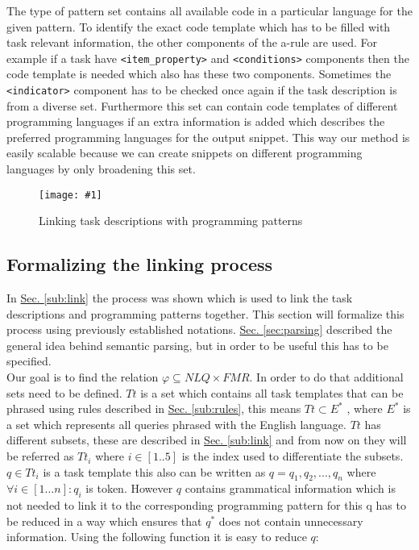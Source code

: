 \documentclass[12pt]{article}
\newcommand{\refThis}[2]{\hyperref[#1]{#2 \ref{#1}}}
\newcommand{\insertPic}[3]
{   %
        \begin{figure}[h!]				
        \centering							
        \texttt{[image: \#1]}
        \caption{#3}						
        \label{fig:#1}						
        \end{figure}		
}
\begin{document}
    The type of pattern set contains all available code in a particular language for the given pattern. To identify the exact code template which has to be filled with task relevant information, the other components of the a-rule are used. For example if a task have \verb|<item_property>| and \verb|<conditions>| components then the code template is needed which also has these two components. Sometimes the \verb|<indicator>| component has to be checked once again if the task description is from a diverse set. Furthermore this set can contain code templates of different programming languages if an extra information is added which describes the preferred programming languages for the output snippet. This way our method is easily scalable because we can create snippets on different programming languages by only broadening this set.
    \insertPic{link}{0.5}{Linking task descriptions with programming patterns}
    
    \subsection{Formalizing the linking process}
    In \refThis{sub:link}{Sec.} the process was shown which is used to link the task descriptions and programming patterns together. This section will formalize this process using previously established notations. \refThis{sec:parsing}{Sec.} described the general idea behind semantic parsing, but in order to be useful this has to be specified.\\
    Our goal is to find the relation $\varphi \subseteq NLQ \times FMR$. In order to do that additional sets need to be defined. $Tt$ is a set which contains all task templates that can be phrased using rules described in \refThis{sub:rules}{Sec.}, this means $Tt \subset E^{*}$ , where $E^{*}$ is a set which represents all queries phrased with the English language. $Tt$ has different subsets, these are described in \refThis{sub:link}{Sec.} and from now on they will be referred as $Tt_{i}$ where $i \in [1..5]$ is the index used to differentiate the subsets. $q \in Tt_{i}$ is a task template this also can be written as $q = q_1, q_2, ... , q_n$ where $\forall i \in [1…n] : q_i$ is token. However $q$ contains grammatical information which is not needed to link it to the corresponding programming pattern for this q has to be reduced in a way which ensures that $q^*$ does not contain unnecessary information. Using the following function it is easy to reduce $q$:
 
\end{document}
